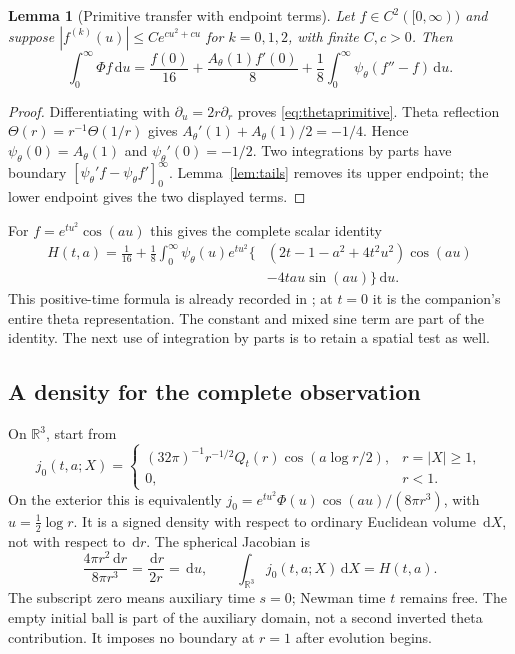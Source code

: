 \documentclass[11pt]{article}
\numberwithin{equation}{section}
\newtheorem{lemma}[theorem]{Lemma}
\newcommand{\dd}{\,\mathrm d}
\newcommand{\R}{\mathbb R}
\begin{document}
\begin{lemma}[Primitive transfer with endpoint terms]
\label{lem:primitivetransfer}
Let $f\in C^2([0,\infty))$ and suppose
$|f^{(k)}(u)|\le C e^{cu^2+cu}$ for $k=0,1,2$, with finite $C,c>0$.
Then
\begin{equation}\label{eq:primitivetransfer}
 \int_0^\infty\Phi f\dd u
 =\frac{f(0)}{16}+\frac{A_\theta(1)f'(0)}8
   +\frac18\int_0^\infty\psi_\theta(f''-f)\dd u.
\end{equation}
\end{lemma}
\begin{proof}
Differentiating with $\partial_u=2r\partial_r$ proves
\eqref{eq:thetaprimitive}. Theta reflection
$\Theta(r)=r^{-1}\Theta(1/r)$ gives
$A_\theta'(1)+A_\theta(1)/2=-1/4$. Hence
$\psi_\theta(0)=A_\theta(1)$ and $\psi_\theta'(0)=-1/2$.
Two integrations by parts have boundary
$[\psi_\theta'f-\psi_\theta f']_0^\infty$.
Lemma~\ref{lem:tails} removes its upper endpoint; the lower endpoint
gives the two displayed terms.
\end{proof}

For $f=e^{tu^2}\cos(au)$ this gives the complete scalar identity
\begin{equation}\label{eq:primitivedeformed}
 \begin{split}
 H(t,a)=\frac1{16}+\frac18\int_0^\infty
 \psi_\theta(u)e^{tu^2}\big\{&
 (2t-1-a^2+4t^2u^2)\cos(au)\\
 &-4tau\sin(au)\big\}\dd u .
 \end{split}
\end{equation}
This positive-time formula is already recorded in \cite{ScalarIBPNote};
at $t=0$ it is the companion's entire theta representation.
The constant and mixed sine term are part of the identity. The next
use of integration by parts is to retain a spatial test as well.

\subsection{A density for the complete observation}\label{sec:conservative}

On $\mathbb R^3$, start from
\begin{equation}\label{eq:densityinitial}
j_0(t,a;X)=
 \begin{cases}
 (32\pi)^{-1}r^{-1/2}Q_t(r)\cos(a\log r/2),&r=|X|\ge1,\\
 0,&r<1.
 \end{cases}
\end{equation}
On the exterior this is equivalently
$j_0=e^{tu^2}\Phi(u)\cos(au)/(8\pi r^3)$, with
$u=\frac12\log r$. It is a signed density with respect to ordinary
Euclidean volume $\dd X$, not with respect to $\dd r$. The spherical
Jacobian is
\begin{equation}\label{eq:densityjacobian}
 \frac{4\pi r^2\dd r}{8\pi r^3}
 =\frac{\dd r}{2r}=\dd u,\qquad
 \int_{\R^3}j_0(t,a;X)\dd X=H(t,a).
\end{equation}
The subscript zero means auxiliary time $s=0$; Newman time $t$ remains
free. The empty initial ball is part of the auxiliary domain, not a
second inverted theta contribution. It imposes no boundary at $r=1$
after evolution begins.
\end{document}
